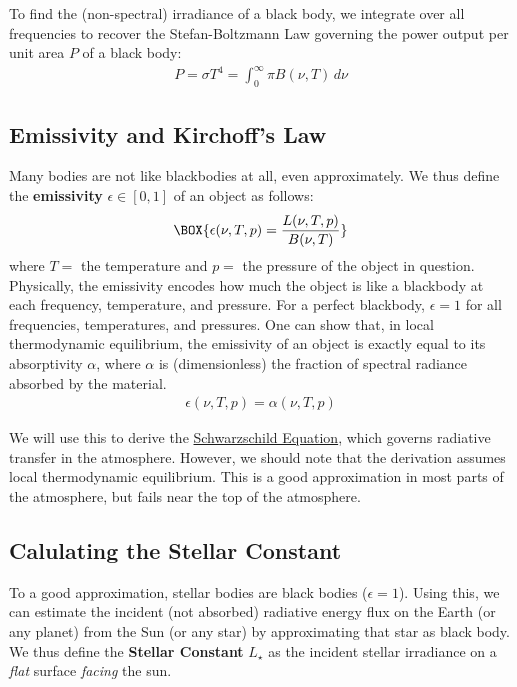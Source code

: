 To find the (non-spectral) irradiance of a black body, we integrate over all frequencies to recover the Stefan-Boltzmann Law governing the power output per unit area $P$ of a black body:
\begin{align}\label{Blackbody Frequency}
    \boxed{P=\sigma T^4=\int_0^\infty \pi B(\nu,T)\,d\nu}
\end{align}
\subsection{Emissivity and Kirchoff's Law}

Many bodies are not like blackbodies at all, even approximately. We thus define the \textbf{emissivity} $\epsilon\in[0,1]$ of an object as follows:
\begin{align}
    \BOX{\epsilon(\nu,T,p)=\frac{L(\nu,T,p)}{B(\nu,T)}}
\end{align}
where $T=$ the temperature and $p=$ the pressure of the object in question. Physically, the emissivity encodes how much the object is like a blackbody at each frequency, temperature, and pressure. For a perfect blackbody, $\epsilon=1$ for all frequencies, temperatures, and pressures. One can show that, in local thermodynamic equilibrium, the emissivity of an object is exactly equal to its absorptivity $\alpha$, where $\alpha$ is (dimensionless) the fraction of spectral radiance absorbed by the material.
\begin{align}
    \boxed{\epsilon(\nu,T,p)=\alpha(\nu,T,p)}
\end{align}

We will use this to derive the \hyperref[Schwarzschild]{Schwarzschild Equation}, which governs radiative transfer in the atmosphere. However, we should note that the derivation assumes local thermodynamic equilibrium. This is a good approximation in most parts of the atmosphere, but fails near the top of the atmosphere.

\subsection{Calulating the Stellar Constant}

To a good approximation, stellar bodies are black bodies ($\epsilon=1$). Using this, we can estimate the incident (not absorbed) radiative energy flux on the Earth (or any planet) from the Sun (or any star) by approximating that star as black body. We thus define the \textbf{Stellar Constant} $L_{\star}$ as the incident stellar irradiance on a \textit{flat} surface \textit{facing} the sun. 

